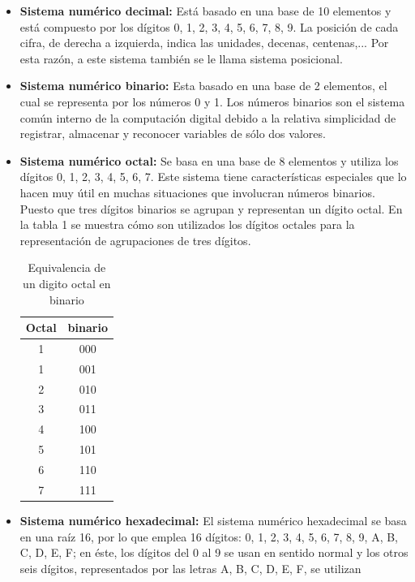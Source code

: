\documentclass[12pt]{article}
\begin{document}
			\begin{itemize}
				\item \textbf{Sistema numérico decimal:}
					 Está basado en una base de 10 elementos y está compuesto por los dígitos
					 0, 1, 2, 3, 4, 5, 6, 7, 8, 9. La posición de cada cifra, de derecha a izquierda, indica las
					 unidades, decenas, centenas,... Por esta razón, a este sistema también se le llama
					 sistema posicional.
				\item \textbf{Sistema numérico binario:}
					 Esta basado en una base de 2 elementos, el cual se representa por los números 0 y 1.
					 Los números binarios son el sistema común interno de la computación digital debido a la 
					 relativa simplicidad de registrar, almacenar y reconocer variables de sólo dos valores.
				\item \textbf{Sistema numérico octal:}
					 Se basa en una base de 8 elementos y utiliza los dígitos 0, 1, 2, 3, 4, 5, 6, 7. Este sistema 
					 tiene características especiales que lo hacen muy útil en muchas situaciones que involucran 
					 números binarios. Puesto que tres dígitos binarios se agrupan y representan un dígito octal.
					 En la tabla 1 se muestra cómo son utilizados los dígitos octales para la representación de 
					 agrupaciones de tres dígitos.
					\begin{table}[h!]
						\centering
						\begin{tabular}{|c|c|}
							\hline
							Octal & binario \\\hline
							1 & 000 \\\hline
							1 & 001 \\\hline								
							2 & 010 \\\hline
							3 & 011 \\\hline
							4 & 100 \\\hline
							5 & 101 \\\hline
							6 & 110 \\\hline
							7 & 111 \\\hline
						\end{tabular}
						\caption{Equivalencia de un digito octal en binario}
						\label{tab:1}
					\end{table}
				\item \textbf{Sistema numérico hexadecimal:}
					 El sistema numérico hexadecimal se basa en una raíz 16, por lo que emplea 16 dígitos: 0, 1, 2, 
					 3, 4, 5, 6, 7, 8, 9, A, B, C, D, E, F; en éste, los dígitos del 0 al 9 se usan en sentido 
					 normal y los otros seis dígitos, representados por las letras A, B, C, D, E, F, se utilizan 

\end{itemize}
\end{document}
